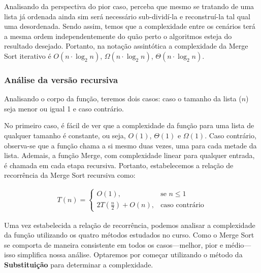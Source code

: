 Analisando da perspectiva do pior caso, perceba que mesmo se tratando de uma lista já ordenada ainda sim será necessário sub-dividí-la e reconstruí-la tal qual uma desordenada. Sendo assim, temos que a complexidade entre os cenários terá a mesma ordem independentemente do quão perto o algoritmos esteja do resultado desejado. Portanto, na notação assintótica a complexidade da Merge Sort iterativo é $O(n \cdot \log_2{n})$, $\Omega(n \cdot \log_2{n})$, $\Theta(n \cdot \log_2{n})$.

\subsubsection{Análise da versão recursiva}

Analisando o corpo da função, teremos dois casos: caso o tamanho da lista ($n$) seja menor ou igual 1 e caso contrário.

\begin{algorithm}
	\begin{algorithmic}[0]
		 \Return
		\EndIf
		\State {}
	\end{algorithmic}
\end{algorithm}
\FloatBarrier

No primeiro caso, é fácil de ver que a complexidade da função para uma lista de qualquer tamanho é constante, ou seja, $O(1)$, $\Theta(1)$ e $\Omega(1)$. Caso contrário, observa-se que a função chama a si mesmo duas vezes, uma para cada metade da lista. Ademais, a função Merge, com complexidade linear para qualquer entrada, é chamada em cada etapa recursiva. Portanto, estabelecemos a relação de recorrência da Merge Sort recursiva como:


\begin{align*}
	T(n) =
	\begin{cases}
		O(1),                   & \text{se $n \leq 1$}  \\
		2T(\frac{n}{2}) + O(n), & \text{caso contrário}
	\end{cases}
\end{align*}

Uma vez estabelecida a relação de recorrência, podemos analisar a complexidade da função utilizando os quatro métodos estudados no curso. Como o Merge Sort se comporta de maneira consistente em todos os casos—melhor, pior e médio—isso simplifica nossa análise. Optaremos por começar utilizando o método da \textbf{Substituição} para determinar a complexidade.

